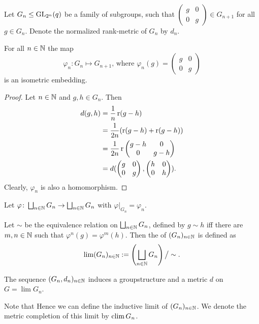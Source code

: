 Let $G_n\leq \operatorname{GL}_{2^n}(q)$ be a family of subgroups, such that 
$\begin{pmatrix}
g &0\\
0&g
\end{pmatrix}\in G_{n+1}$ for all $g\in G_n$. Denote the normalized rank-metric of $G_n$ by $d_n$.
\begin{lemma}
For all $n\in \mathbb{N}$ the map
\[\varphi_n\colon G_n\mapsto G_{n+1}\text{, where }\varphi_n(g)=\begin{pmatrix}
g &0\\
0&g
\end{pmatrix}\]
is an isometric embedding. 
\end{lemma}
\begin{proof}
Let $n\in\mathbb{N}$ and $g,h\in G_n$. Then
\begin{align*}
d(g,h)&=\frac{1}{n}\operatorname{r}(g-h)\\
&=\frac{1}{2n}(\operatorname{r}(g-h)+\operatorname{r}(g-h))\\
&=\frac{1}{2n}\operatorname{r}
\begin{pmatrix}
g-h &0\\
0&g-h
\end{pmatrix}\\
&=d(
\begin{pmatrix}
g &0\\
0&g
\end{pmatrix},
\begin{pmatrix}
h &0\\
0&h
\end{pmatrix}).
\end{align*}
Clearly, $\varphi_n$ is also a homomorphism.
\end{proof}

Let $\varphi\colon\bigsqcup_{n\in\mathbb{N}} G_n\to\bigsqcup_{n\in\mathbb{N}} G_n$ with $\varphi|_{G_n}=\varphi_n$.
\begin{definition}
Let $\sim$ be the equivalence relation on $\bigsqcup_{n\in\mathbb{N}} G_n$, defined by $g\sim h$ iff there are $m,n\in\mathbb{N}$ such that $\varphi^n(g)=\varphi^m(h)$.
Then the  of $(G_n)_{n\in\mathbb{N}}$ is defined as
\[\lim (G_n)_{n\in\mathbb{N}}:=\left(\bigsqcup_{n\in\mathbb{N}} G_n\right)\big/\sim.\]
\end{definition}
\begin{lemma}
The sequence $(G_n,d_n)_{n\in\mathbb{N}}$ induces a groupstructure and a metric $d$ on $G=\lim G_n$.
\end{lemma}

Note that Hence we can define the inductive limit of $(G_n)_{n\in\mathbb{N}}$. We denote the metric completion of this limit by $\operatorname{clim} G_n$.%
